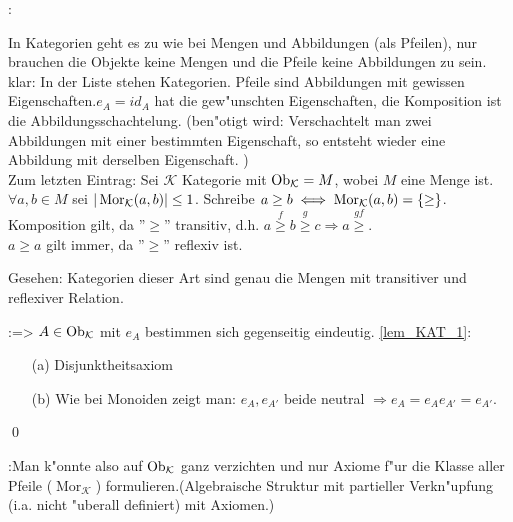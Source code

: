 \remark{}:{In Kategorien geht es zu wie bei Mengen und Abbildungen (als Pfeilen), 
 nur brauchen die Objekte keine Mengen und die Pfeile keine Abbildungen zu sein.\\
 klar: In der Liste stehen Kategorien. Pfeile sind Abbildungen mit gewissen 
 Eigenschaften.$e_A=id_A$ hat die gew"unschten Eigenschaften, die Komposition 
 ist die Abbildungsschachtelung. (ben"otigt wird: Verschachtelt man zwei Abbildungen
 mit einer bestimmten Eigenschaft, so entsteht wieder eine Abbildung 
 mit derselben Eigenschaft. )\\
 Zum letzten Eintrag: Sei $\mathcal{K}$ Kategorie mit $\operatorname{Ob}_{\mathcal{K}}=M$,
 wobei $M$ eine Menge ist. $\forall a,b\in M$ sei $|\Mor(K;a;b)|\leq 1$. 
 Schreibe $a\geq b\iff \Mor(K;a;b)=\{\geq\}$.
 Komposition gilt, da ''$\geq$'' transitiv, d.h.
 $a\stackrel{f}{\geq} b\stackrel{g}{\geq} c \Rightarrow a\stackrel{gf}{\geq}$.\\
 $a\geq a$ gilt immer, da ''$\geq$'' reflexiv ist.
 
 Gesehen: Kategorien dieser Art sind genau die Mengen mit transitiver und
 reflexiver Relation.
  }   
\lemma{}:{}=>{\label{lem_KAT_1}
$A\in \operatorname{Ob}_{\mathcal{K}}$ mit $e_A$ bestimmen sich gegenseitig eindeutig.}
\proof \ref{lem_KAT_1}:{\begin{enumerate}
  \item[(a)] Disjunktheitsaxiom
  \item[(b)] Wie bei Monoiden zeigt man: $e_A,e_{A'}$ beide neutral
  $\Rightarrow e_A=e_Ae_{A'}=e_{A'}$.
  \end{enumerate}
  \qed  }	           
\remark{}:{Man k"onnte also auf $\operatorname{Ob}_{\mathcal{K}}$ ganz verzichten und nur Axiome
 f"ur die Klasse aller Pfeile ($\operatorname{Mor}_{\mathcal{K}}$)
 formulieren.(Algebraische Struktur mit partieller Verkn"upfung (i.a.
 nicht "uberall definiert) mit Axiomen.)}
